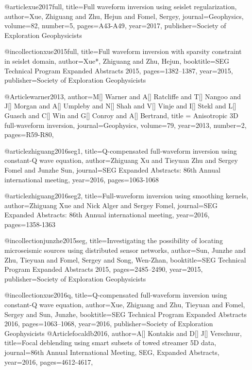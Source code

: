 {@article{xue2017full,
  title={Full waveform inversion using seislet regularization},
  author={Xue, Zhiguang and Zhu, Hejun and Fomel, Sergey},
  journal={Geophysics},
  volume={82},
  number={5},
  pages={A43-A49},
  year={2017},
  publisher={Society of Exploration Geophysicists}
}

@incollection{xue2015full,
  title={Full waveform inversion with sparsity constraint in seislet domain},
  author={Xue*, Zhiguang and Zhu, Hejun},
  booktitle={SEG Technical Program Expanded Abstracts 2015},
  pages={1382--1387},
  year={2015},
  publisher={Society of Exploration Geophysicists}
}


@Article{warner2013,
  author={M[] Warner and A[] Ratcliffe and T[] Nangoo and J[] Morgan and A[] Umpleby and N[] Shah and V[] Vinje and I[] Stekl and L[] Guasch and C[] Win and G[] Conroy and A[] Bertrand},
  title = {Anisotropic 3{D} full-waveform inversion},
  journal={Geophysics},
  volume=79,
  year=2013,
  number=2,
  pages={R59-R80},
}


@article{zhiguang2016seg1,
  title={Q-compensated full-waveform inversion using constant-Q wave equation},
  author={Zhiguang Xu and Tieyuan Zhu and Sergey Fomel and Junzhe Sun},
  journal={SEG Expanded Abstracts: 86th Annual international meeting},
  year={2016},
  pages={1063-1068}
}

@article{zhiguang2016seg2,
  title={Full-waveform inversion using smoothing kernels},
  author={Zhiguang Xue and Nick Alger and Sergey Fomel},
  journal={SEG Expanded Abstracts: 86th Annual international meeting},
  year={2016},
  pages={1358-1363}
}

@incollection{junzhe2015seg,
  title={Investigating the possibility of locating microseismic sources using distributed sensor networks},
  author={Sun, Junzhe and Zhu, Tieyuan and Fomel, Sergey and Song, Wen-Zhan},
  booktitle={SEG Technical Program Expanded Abstracts 2015},
  pages={2485--2490},
  year={2015},
  publisher={Society of Exploration Geophysicists}
}

@incollection{xue2016q,
  title={Q-compensated full-waveform inversion using constant-Q wave equation},
  author={Xue, Zhiguang and Zhu, Tieyuan and Fomel, Sergey and Sun, Junzhe},
  booktitle={SEG Technical Program Expanded Abstracts 2016},
  pages={1063--1068},
  year={2016},
  publisher={Society of Exploration Geophysicists}
}
@Article{focaldb2016,
  author={A[] Kontakis and D[] J[] Verschuur},
  title={Focal deblending using smart subsets of towed streamer 5{D} data},
  journal={86th Annual International Meeting, SEG, Expanded Abstracts},
  year=2016,
  pages={4612-4617},
}

}
